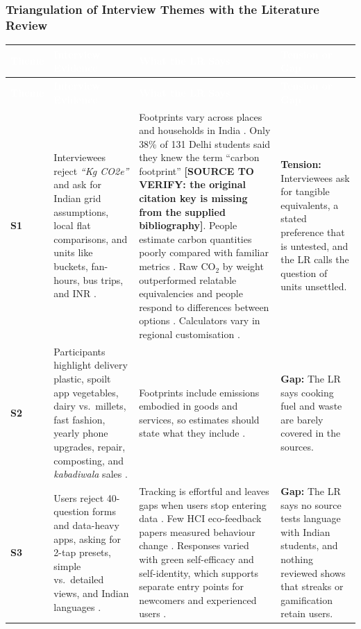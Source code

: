 \documentclass[12pt, a4paper]{article}
\begin{document}
\subsubsection*{Triangulation of Interview Themes with the Literature Review}
\begin{longtable}{|>{\raggedright\arraybackslash}p{1.2cm}|>{\raggedright\arraybackslash}p{4.5cm}|>{\raggedright\arraybackslash}p{5.5cm}|>{\raggedright\arraybackslash}p{4.3cm}|}
\hline
\rowcolor{cNavy}
\textcolor{white}{\textbf{Theme}} & \textcolor{white}{\textbf{Interview Evidence}} & \textcolor{white}{\textbf{What the LR Says}} & \textcolor{white}{\textbf{Tension or Gap}} \\
\hline
\endfirsthead
\hline
\rowcolor{cNavy}
\textcolor{white}{\textbf{Theme}} & \textcolor{white}{\textbf{Interview Evidence}} & \textcolor{white}{\textbf{What the LR Says}} & \textcolor{white}{\textbf{Tension or Gap}} \\
\hline
\endhead
\hline
\endfoot

\textbf{S1} & Interviewees reject \textit{``Kg CO2e''} and ask for Indian grid assumptions, local flat comparisons, and units like buckets, fan-hours, bus trips, and INR \cite{cf1, cf2, cf4, cf6, cf8}. & Footprints vary across places and households in India \cite{lee2021}. Only 38\% of 131 Delhi students said they knew the term ``carbon footprint'' \textbf{[SOURCE TO VERIFY: the original citation key is missing from the supplied bibliography]}. People estimate carbon quantities poorly compared with familiar metrics \cite{grinstein2018}. Raw $\text{CO}_2$ by weight outperformed relatable equivalencies and people respond to differences between options \cite{mohanty2023}. Calculators vary in regional customisation \cite{mulrow2019}. & \textbf{Tension:} Interviewees ask for tangible equivalents, a stated preference that is untested, and the LR calls the question of units unsettled. \\
\hline

\textbf{S2} & Participants highlight delivery plastic, spoilt app vegetables, dairy vs.\ millets, fast fashion, yearly phone upgrades, repair, composting, and \textit{kabadiwala} sales \cite{cf1, cf2, cf3, cf4, cf5, cf7, cf8, cf10}. & Footprints include emissions embodied in goods and services, so estimates should state what they include \cite{shi2021}. & \textbf{Gap:} The LR says cooking fuel and waste are barely covered in the sources. \\
\hline

\textbf{S3} & Users reject 40-question forms and data-heavy apps, asking for 2-tap presets, simple vs.\ detailed views, and Indian languages \cite{cf1, cf2, cf3, cf4, cf7, cf8, cf9, cf10}. & Tracking is effortful and leaves gaps when users stop entering data \cite{hoffmann2024}. Few HCI eco-feedback papers measured behaviour change \cite{froehlich2010}. Responses varied with green self-efficacy and self-identity, which supports separate entry points for newcomers and experienced users \cite{hoffmann2024}. & \textbf{Gap:} The LR says no source tests language with Indian students, and nothing reviewed shows that streaks or gamification retain users. \\
\hline


\end{longtable}
\end{document}
